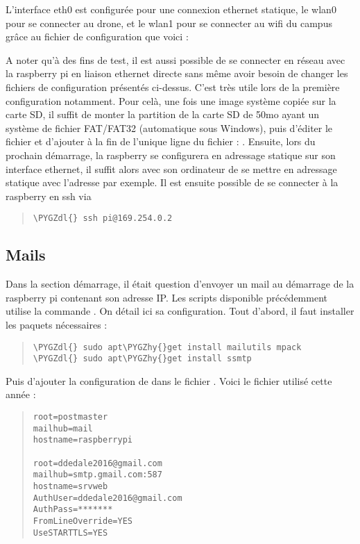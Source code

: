 \documentclass[letterpaper,10pt,french]{sphinxmanual}
\def\PYGZdl{\char`\$}
\def\PYGZhy{\char`\-}
\begin{document}
L'interface eth0 est configurée pour une connexion ethernet statique, le wlan0 pour se connecter au drone, et le wlan1
pour se connecter au wifi du campus grâce au fichier de configuration  que voici :
\begin{quote}
\end{quote}

A noter qu'à des fins de test, il est aussi possible de se connecter en réseau avec la raspberry pi en liaison ethernet
directe sans même avoir besoin de changer les fichiers de configuration présentés ci-dessus. C'est très utile lors de la
première configuration notamment. Pour celà, une fois une image système copiée sur la carte SD, il suffit de monter la
partition de la carte SD de 50mo ayant un système de fichier FAT/FAT32 (automatique sous Windows), puis d'éditer le
fichier  et d'ajouter à la fin de l'unique ligne du fichier : . Ensuite, lors du
prochain démarrage, la raspberry se configurera en adressage statique sur son interface ethernet, il suffit alors avec
son ordinateur de se mettre en adressage statique avec l'adresse  par exemple. Il est ensuite possible
de se connecter à la raspberry en ssh via
\begin{quote}

\begin{Verbatim}[commandchars=\\\{\}]
\PYGZdl{} ssh pi@169.254.0.2
\end{Verbatim}
\end{quote}


\subsection{Mails}
\label{raspberrypi:mails}
Dans la section démarrage, il était question d'envoyer un mail au démarrage de la raspberry pi contenant son adresse IP.
Les scripts disponible précédemment utilise la commande . On détail ici sa configuration. Tout d'abord, il faut
installer les paquets nécessaires :
\begin{quote}

\begin{Verbatim}[commandchars=\\\{\}]
\PYGZdl{} sudo apt\PYGZhy{}get install mailutils mpack
\PYGZdl{} sudo apt\PYGZhy{}get install ssmtp
\end{Verbatim}
\end{quote}

Puis d'ajouter la configuration de  dans le fichier . Voici le fichier utilisé cette année :
\begin{quote}

\begin{Verbatim}[commandchars=\\\{\}]
root=postmaster
mailhub=mail
hostname=raspberrypi

root=ddedale2016@gmail.com
mailhub=smtp.gmail.com:587
hostname=srvweb
AuthUser=ddedale2016@gmail.com
AuthPass=*******
FromLineOverride=YES
UseSTARTTLS=YES
\end{Verbatim}
\end{quote}
\end{document}
